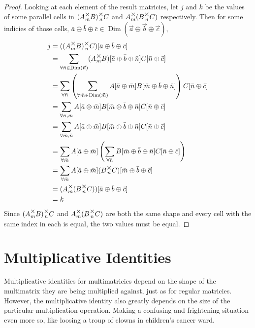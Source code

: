 \documentclass[12pt]{book}
\theoremstyle{definition}
\theoremstyle{plain}
\theoremstyle{ppart}
\theoremstyle{case}
\theoremstyle{solution}
\DeclareMathOperator{\Dim}{Dim}
\newcommand{\mmult}[1]{\text{\raisebox{1ex}{$\underset{#1}{\times}$}}}
\begin{document}
\begin{proof}
Looking at each element of the result matricies, let $j$ and $k$ be the values
of some parallel cells in $(A \mmult{m} B) \mmult{n} C$ and
$A \mmult{m} (B \mmult{n} C)$ respectively. Then for some indicies of those cells,
$\bar{a} \oplus \bar{b} \oplus \bar{c} \in
\Dim(\vec{a} \oplus \vec{b} \oplus \vec{c})$,
\begin{align*}
 j
 &= ((A \mmult{m} B) \mmult{n} C)[\bar{a} \oplus \bar{b} \oplus \bar{c}] \\
 &= \sum_{\forall \bar{n} \in \Dim(\vec{n})}
 (A \mmult{m} B)[\bar{a} \oplus \bar{b} \oplus \bar{n}]
 C[\bar{n} \oplus \bar{c}] \\
 &= \sum_{\forall \bar{n}}
 \left(
  \sum_{\forall \bar{m} \in \Dim(\vec{m})}
  A[\bar{a} \oplus \bar{m}]B[\bar{m} \oplus \bar{b} \oplus \bar{n}]
 \right)
 C[\bar{n} \oplus \bar{c}] \\
 &= \sum_{\forall \bar{n}, \bar{m}}
 A[\bar{a} \oplus \bar{m}]
 B[\bar{m} \oplus \bar{b} \oplus \bar{n}]
 C[\bar{n} \oplus \bar{c}] \\
 &= \sum_{\forall \bar{m}, \bar{n}}
 A[\bar{a} \oplus \bar{m}]
 B[\bar{m} \oplus \bar{b} \oplus \bar{n}]
 C[\bar{n} \oplus \bar{c}] \\
 &= \sum_{\forall \bar{m}}
 A[\bar{a} \oplus \bar{m}]
 \left(
 \sum_{\forall \bar{n}}
  B[\bar{m} \oplus \bar{b} \oplus \bar{n}]
  C[\bar{n} \oplus \bar{c}]
 \right) \\
 &= \sum_{\forall \bar{m}}
 A[\bar{a} \oplus \bar{m}]
 (B \mmult{n} C)[\bar{m} \oplus \bar{b} \oplus \bar{c}] \\
 &= (A \mmult{m} (B \mmult{n} C))[\bar{a} \oplus \bar{b} \oplus \bar{c}] \\
 &= k
\end{align*}
Since $(A \mmult{m} B) \mmult{n} C$ and $A \mmult{m} (B \mmult{n} C)$ are both
the same shape and every cell with the same index in each is equal, the two
values must be equal.
\end{proof}

\section{Multiplicative Identities}

Multiplicative identities for multimatricies depend on the shape of the
multimatrix they are being multiplied against, just as for regular matricies.
However, the multiplicative identity also greatly depends on the size of
the particular multiplication operation. Making a confusing and frightening
situation even more so, like loosing a troup of clowns in children's cancer ward.
\end{document}
